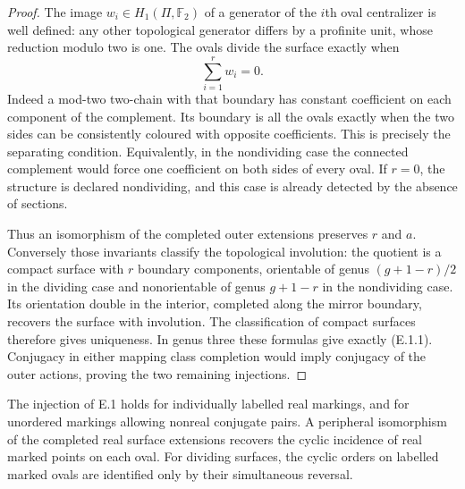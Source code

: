\begin{proof}
The image $w_i\in H_1(\Pi,\mathbb F_2)$ of a generator of the
$i$th oval centralizer is well defined: any other topological
generator differs by a profinite unit, whose reduction modulo
two is one.  The ovals divide the surface exactly when
\[
                         \sum_{i=1}^r w_i=0.                 \tag{E.1.2}
\]
Indeed a mod-two two-chain with that boundary has constant
coefficient on each component of the complement.  Its boundary
is all the ovals exactly when the two sides can be consistently
coloured with opposite coefficients.  This is precisely the
separating condition.  Equivalently, in the nondividing case
the connected complement would force one coefficient on both
sides of every oval.  If $r=0$, the structure is declared
nondividing, and this case is already detected by the absence
of sections.

Thus an isomorphism of the completed outer extensions preserves
$r$ and $a$.  Conversely those invariants classify the
topological involution: the quotient is a compact surface with
$r$ boundary components, orientable of genus
$(g+1-r)/2$ in the dividing case and nonorientable of genus
$g+1-r$ in the nondividing case.  Its orientation double in the
interior, completed along the mirror boundary, recovers the
surface with involution.  The classification of compact surfaces
therefore gives uniqueness.  In genus three these formulas give
exactly (E.1.1).  Conjugacy in either mapping class completion
would imply conjugacy of the outer actions, proving the two
remaining injections.
\end{proof}

The injection of E.1 holds for individually labelled real markings,
and for unordered markings allowing nonreal conjugate pairs.
A peripheral isomorphism of the completed real surface extensions
recovers the cyclic incidence of real marked points on each oval.
For dividing surfaces, the cyclic orders on labelled marked ovals
are identified only by their simultaneous reversal.

